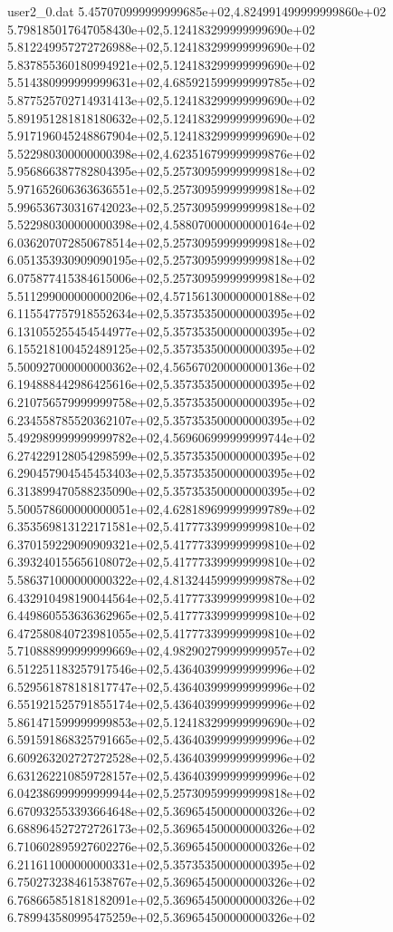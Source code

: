 \begin{filecontents}{user2_0.dat}
5.457070999999999685e+02,4.824991499999999860e+02
5.798185017647058430e+02,5.124183299999999690e+02
5.812249957272726988e+02,5.124183299999999690e+02
5.837855360180994921e+02,5.124183299999999690e+02
5.514380999999999631e+02,4.685921599999999785e+02
5.877525702714931413e+02,5.124183299999999690e+02
5.891951281818180632e+02,5.124183299999999690e+02
5.917196045248867904e+02,5.124183299999999690e+02
5.522980300000000398e+02,4.623516799999999876e+02
5.956866387782804395e+02,5.257309599999999818e+02
5.971652606363636551e+02,5.257309599999999818e+02
5.996536730316742023e+02,5.257309599999999818e+02
5.522980300000000398e+02,4.588070000000000164e+02
6.036207072850678514e+02,5.257309599999999818e+02
6.051353930909090195e+02,5.257309599999999818e+02
6.075877415384615006e+02,5.257309599999999818e+02
5.511299000000000206e+02,4.571561300000000188e+02
6.115547757918552634e+02,5.357353500000000395e+02
6.131055255454544977e+02,5.357353500000000395e+02
6.155218100452489125e+02,5.357353500000000395e+02
5.500927000000000362e+02,4.565670200000000136e+02
6.194888442986425616e+02,5.357353500000000395e+02
6.210756579999999758e+02,5.357353500000000395e+02
6.234558785520362107e+02,5.357353500000000395e+02
5.492989999999999782e+02,4.569606999999999744e+02
6.274229128054298599e+02,5.357353500000000395e+02
6.290457904545453403e+02,5.357353500000000395e+02
6.313899470588235090e+02,5.357353500000000395e+02
5.500578600000000051e+02,4.628189699999999789e+02
6.353569813122171581e+02,5.417773399999999810e+02
6.370159229090909321e+02,5.417773399999999810e+02
6.393240155656108072e+02,5.417773399999999810e+02
5.586371000000000322e+02,4.813244599999999878e+02
6.432910498190044564e+02,5.417773399999999810e+02
6.449860553636362965e+02,5.417773399999999810e+02
6.472580840723981055e+02,5.417773399999999810e+02
5.710888999999999669e+02,4.982902799999999957e+02
6.512251183257917546e+02,5.436403999999999996e+02
6.529561878181817747e+02,5.436403999999999996e+02
6.551921525791855174e+02,5.436403999999999996e+02
5.861471599999999853e+02,5.124183299999999690e+02
6.591591868325791665e+02,5.436403999999999996e+02
6.609263202727272528e+02,5.436403999999999996e+02
6.631262210859728157e+02,5.436403999999999996e+02
6.042386999999999944e+02,5.257309599999999818e+02
6.670932553393664648e+02,5.369654500000000326e+02
6.688964527272726173e+02,5.369654500000000326e+02
6.710602895927602276e+02,5.369654500000000326e+02
6.211611000000000331e+02,5.357353500000000395e+02
6.750273238461538767e+02,5.369654500000000326e+02
6.768665851818182091e+02,5.369654500000000326e+02
6.789943580995475259e+02,5.369654500000000326e+02

\end{filecontents}
